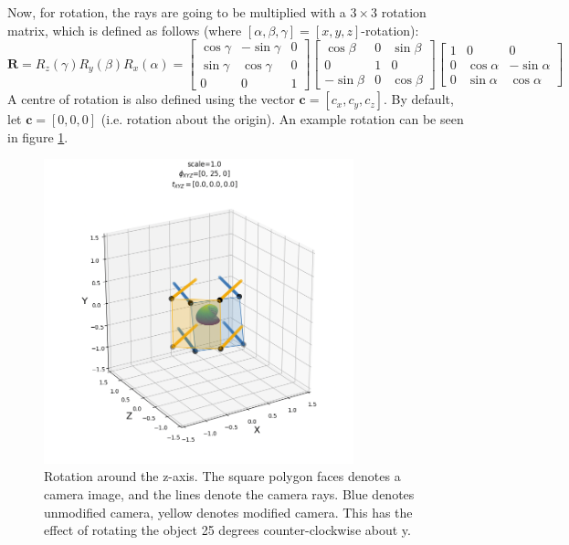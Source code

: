 Now, for rotation, the rays are going to be multiplied with a $3\times3$ rotation matrix, which is defined as follows (where $[\alpha,\beta,\gamma] = [x,y,z]$-rotation):
\begin{equation}
    \textbf{R} = R_{z}(\gamma) R_{y}(\beta) R_{x}(\alpha) = {\left[\begin{array}{ccc}
    \cos \gamma & -\sin \gamma & 0 \\
    \sin \gamma & \cos \gamma & 0 \\
    0 & 0 & 1
    \end{array}\right]\left[\begin{array}{ccc}
    \cos \beta & 0 & \sin \beta \\
    0 & 1 & 0 \\
    -\sin \beta & 0 & \cos \beta
    \end{array}\right]\left[\begin{array}{ccc}
    1 & 0 & 0 \\
    0 & \cos \alpha & -\sin \alpha \\
    0 & \sin \alpha & \cos \alpha
    \end{array}\right] }
\end{equation}
A centre of rotation is also defined using the vector $\textbf{c} = [c_x, c_y, c_z]$. By default, let $\textbf{c} = [0,0,0]$ (i.e. rotation about the origin). An example rotation can be seen in figure \ref{fig:manip-rotation}.
\begin{figure}[H]
    \centering
    \includegraphics[width=0.8\textwidth]{figures/manip-rotation.png}
    \caption{Rotation around the z-axis. The square polygon faces denotes a camera image, and the lines denote the camera rays. Blue denotes unmodified camera, yellow denotes modified camera. This has the effect of rotating the object 25 degrees counter-clockwise about y.}
    \label{fig:manip-rotation}
\end{figure}

